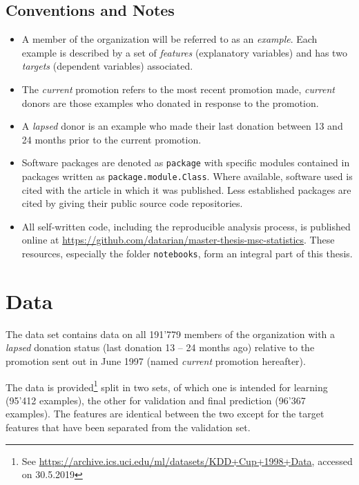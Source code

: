 \documentclass[
  11pt,
  a4paper,
  DIV=12,captions=tableheading,oneside,titlepage]{scrbook}
\begin{document}
\hypertarget{conventions-and-notes}{%
\section{Conventions and Notes}\label{conventions-and-notes}}

\begin{itemize}
\item
  A member of the organization will be referred to as an \emph{example}. Each example is described by a set of \emph{features} (explanatory variables) and has two \emph{targets} (dependent variables) associated.
\item
  The \emph{current} promotion refers to the most recent promotion made, \emph{current} donors are those examples who donated in response to the promotion.
\item
  A \emph{lapsed} donor is an example who made their last donation between 13 and 24 months prior to the current promotion.
\item
  Software packages are denoted as \texttt{package} with specific modules contained in packages written as \texttt{package.module.Class}. Where available, software used is cited with the article in which it was published. Less established packages are cited by giving their public source code repositories.
\item
  All self-written code, including the reproducible analysis process, is published online at \url{https://github.com/datarian/master-thesis-msc-statistics}. These resources, especially the folder \texttt{notebooks}, form an integral part of this thesis.
\end{itemize}

\hypertarget{data}{%
\chapter{Data}\label{data}}

The data set contains data on all 191'779 members of the organization with a \emph{lapsed} donation status (last donation 13 -- 24 months ago) relative to the promotion sent out in June 1997 (named \emph{current} promotion hereafter).

The data is provided\footnote{See \url{https://archive.ics.uci.edu/ml/datasets/KDD+Cup+1998+Data}, accessed on 30.5.2019} split in two sets, of which one is intended for learning (95'412 examples), the other for validation and final prediction (96'367 examples). The features are identical between the two except for the target features that have been separated from the validation set.
\end{document}
